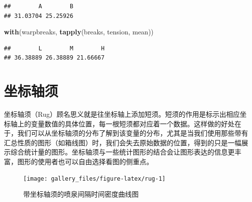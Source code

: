 \documentclass[
  b5paper,
  UTF8,twoside]{book}
\newenvironment{Shaded}{\begin{snugshade}}{\end{snugshade}}
\newcommand{\AttributeTok}[1]{\textcolor[rgb]{0.13,0.29,0.53}{#1}}
\newcommand{\DecValTok}[1]{\textcolor[rgb]{0.00,0.00,0.81}{#1}}
\newcommand{\FloatTok}[1]{\textcolor[rgb]{0.00,0.00,0.81}{#1}}
\newcommand{\FunctionTok}[1]{\textcolor[rgb]{0.13,0.29,0.53}{\textbf{#1}}}
\newcommand{\NormalTok}[1]{#1}
\newcommand{\SpecialCharTok}[1]{\textcolor[rgb]{0.81,0.36,0.00}{\textbf{#1}}}
\newcommand{\StringTok}[1]{\textcolor[rgb]{0.31,0.60,0.02}{#1}}
\begin{document}
\begin{verbatim}
##        A        B 
## 31.03704 25.25926
\end{verbatim}

\begin{Shaded}
\begin{Highlighting}[]
\FunctionTok{with}\NormalTok{(warpbreaks, }\FunctionTok{tapply}\NormalTok{(breaks, tension, mean))}
\end{Highlighting}
\end{Shaded}

\begin{verbatim}
##        L        M        H 
## 36.38889 26.38889 21.66667
\end{verbatim}

\section{坐标轴须}\label{sec:rug}

坐标轴须（Rug）顾名思义就是往坐标轴上添加短须。短须的作用是标示出相应坐标轴上的变量数值的具体位置，每一根短须都对应着一个数据。这样做的好处在于，我们可以从坐标轴须的分布了解到该变量的分布，尤其是当我们使用那些带有汇总性质的图形（如箱线图）时，我们会失去原始数据的位置，得到的只是一幅展示综合统计量的图形。坐标轴须与一些统计图形的结合会让图形表达的信息更丰富，图形的使用者也可以自由选择看图的侧重点。





\begin{Shaded}
\end{Shaded}

\begin{figure}

{\centering \texttt{[image: gallery\_files/figure-latex/rug-1]} 

}

\caption[带坐标轴须的喷泉间隔时间密度曲线图]{带坐标轴须的喷泉间隔时间密度曲线图}\label{fig:rug}
\end{figure}
\end{document}
